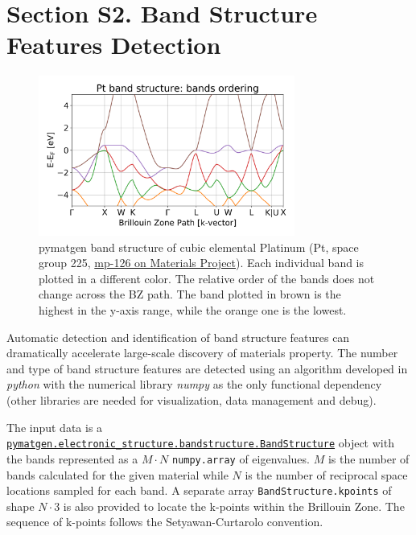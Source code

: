 \documentclass{article}
\begin{document}

\section*{Section S2. Band Structure Features Detection}
\begin{figure}[H]
    \centering
    \includegraphics[width=0.75\textwidth]{SI/figures/mp-126_band-structure_order.png}
    \caption{pymatgen band structure of cubic elemental Platinum (Pt, space group 225, \href{https://materialsproject.org/materials/mp-126/}{mp-126 on Materials Project}). Each individual band is plotted in a different color. The relative order of the bands does not change across the BZ path. The band plotted in brown is the highest in the y-axis range, while the orange one is the lowest.}
    \label{fig:bands_order}
\end{figure}

Automatic detection and identification of band structure features can dramatically accelerate large-scale discovery of materials property. The number and type of band structure features are detected using an algorithm developed in \textit{python} with the numerical library \textit{numpy} as the only functional dependency (other libraries are needed for visualization, data management and debug).

The input data is a \href{https://materialsproject.org/materials/mp-126/}{\texttt{pymatgen.electronic\_structure.bandstructure.BandStructure}} object with the bands represented as a $M \cdot N$ \texttt{numpy.array} of eigenvalues. $M$ is the number of bands calculated for the given material while $N$ is the number of reciprocal space locations sampled for each band. A separate array \texttt{BandStructure.kpoints} of shape $N \cdot 3$ is also provided to locate the k-points within the Brillouin Zone. The sequence of k-points follows the Setyawan-Curtarolo \cite{setyawan2010high} convention.
\end{document}
